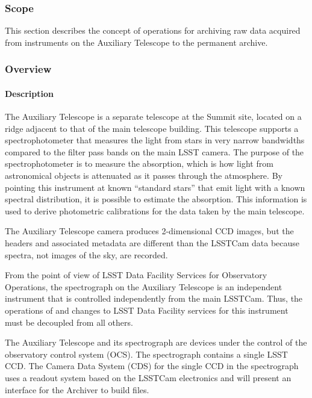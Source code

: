 \subsubsection{Scope}

This section describes the concept of operations for archiving raw data acquired
from instruments on the Auxiliary Telescope to the permanent archive.

\subsubsection{Overview}

\paragraph{Description}

The Auxiliary Telescope is a separate telescope at the Summit site, located on a
ridge adjacent to that of the main telescope building. This telescope supports a
spectrophotometer that measures the light from stars in very narrow bandwidths
compared to the filter pass bands on the main LSST camera. The purpose of the
spectrophotometer is to measure the absorption, which is how light from astronomical
objects is attenuated as it passes through the atmosphere. By pointing this instrument
at known “standard stars” that emit light with a known spectral distribution, it is
possible to estimate the absorption. This information is used to derive photometric
calibrations for the data taken by the main telescope.

The Auxiliary Telescope camera produces 2-dimensional CCD images, but the headers
and associated metadata are different than the LSSTCam data because spectra, not
images of the sky, are recorded. 

From the point of view of LSST Data Facility Services for Observatory Operations, the
spectrograph on the Auxiliary Telescope is an independent instrument that is controlled
independently from the main LSSTCam. Thus, the operations of and changes to LSST
Data Facility services for this instrument must be decoupled from all others.

The Auxiliary Telescope and its spectrograph are devices under the
control of the observatory control system (OCS). The spectrograph
contains a single LSST CCD. The Camera Data System (CDS) for the single CCD in the
spectrograph uses a readout system based on the LSSTCam electronics and will
present an interface for the Archiver to build files.

